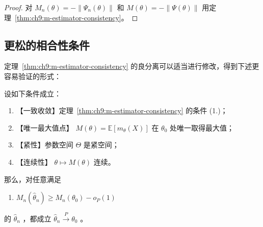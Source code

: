 \begin{proof}

对 $M_n(\theta)=-\|\Psi_n(\theta)\|$ 和 $M(\theta)=-\|\Psi(\theta)\|$ 用定理~\ref{thm:ch9:m-estimator-consistency}。

\end{proof}

\subsection{更松的相合性条件}

定理~\ref{thm:ch9:m-estimator-consistency} 的良分离可以适当进行修改，得到下述更容易验证的形式：

\begin{theorem}\label{thm:ch9:m-estimator-compact-consistency}

设如下条件成立：

\begin{enumerate}
\def\labelenumi{\arabic{enumi}.}
\tightlist
\item
  【一致收敛】定理~\ref{thm:ch9:m-estimator-consistency} 的条件 (1.)；
\item
  【唯一最大值点】 $M(\theta)=\mathbb E[m_\theta(X)]$ 在 $\theta_0$ 处唯一取得最大值；
\item
  【紧性】参数空间 $\Theta$ 是紧空间；
\item
  【连续性】 $\theta\mapsto M(\theta)$ 连续。
\end{enumerate}

那么，对任意满足

\begin{enumerate}
\def\labelenumi{\arabic{enumi}.}
\setcounter{enumi}{4}
\tightlist
\item
  $M_n(\widehat\theta_n)\ge M_n(\theta_0)-o_P(1)$
\end{enumerate}

的 $\widehat\theta_n$ ，都成立 $\widehat\theta_n\overset P\to \theta_0$ 。

\end{theorem}

